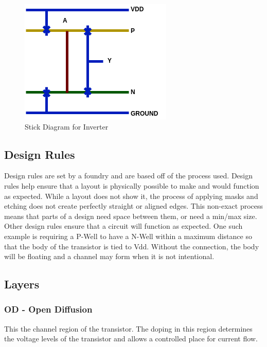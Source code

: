 \documentclass[11pt]{article}
\begin{document}
	\begin{figure}[H]
		\centering
		\includegraphics[width=0.7\linewidth]{"Pictures/Stick Diagram"}
		\caption{Stick Diagram for Inverter}
		\label{fig:stick-diagram}
	\end{figure}
	
	
	
	\subsection{Design Rules}
		
		Design rules are set by a foundry and are based off of the process used. Design rules help ensure that a layout is physically possible to make and would function as expected. While a layout does not show it, the process of applying masks and etching does not create perfectly straight or aligned edges. This non-exact process means that parts of a design need space between them, or need a min/max size. Other design rules ensure that a circuit will function as expected. One such example is requiring a P-Well to have a N-Well within a maximum distance so that the body of the transistor is tied to Vdd. Without the connection, the body will be floating and a channel may form when it is not intentional. 
	
	\subsection{Layers}
	
		\subsubsection{OD - Open Diffusion}
		This the channel region of the transistor. The doping in this region determines the voltage levels of the transistor and allows a controlled place for current flow.
		
\end{document}

